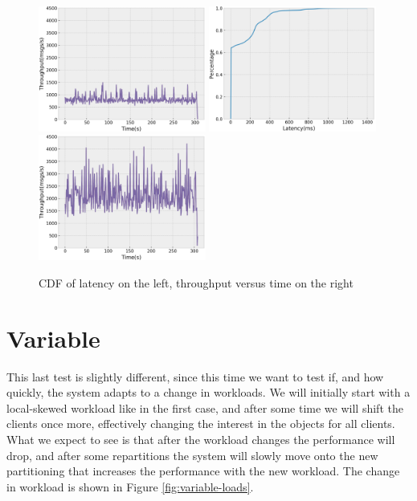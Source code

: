 \begin{figure}[H]
  \includegraphics[width=0.49\textwidth,height=\textheight,keepaspectratio]{img/constant5_tp.png}
  \includegraphics[width=0.49\textwidth,height=\textheight,keepaspectratio]{img/constant1_lat.png}
  \includegraphics[width=0.49\textwidth,height=\textheight,keepaspectratio]{img/constant1_tp.png}
  \caption{ CDF of latency on the left, throughput versus time on the right }
  \label{fig:uniform50-performance}
\end{figure}
\newpage
\section{Variable}\label{sec:variable}
This last test is slightly different, since this time we want to test if, and how quickly, the system adapts to a change in workloads. We will initially start with a local-skewed workload like in the first case, and after some time we will shift the clients once more, effectively changing the interest in the objects for all clients. What we expect to see is that after the workload changes the performance will drop, and after some repartitions the system will slowly move onto the new partitioning that increases the performance with the new workload. The change in workload is shown in Figure \ref{fig:variable-loads}.

